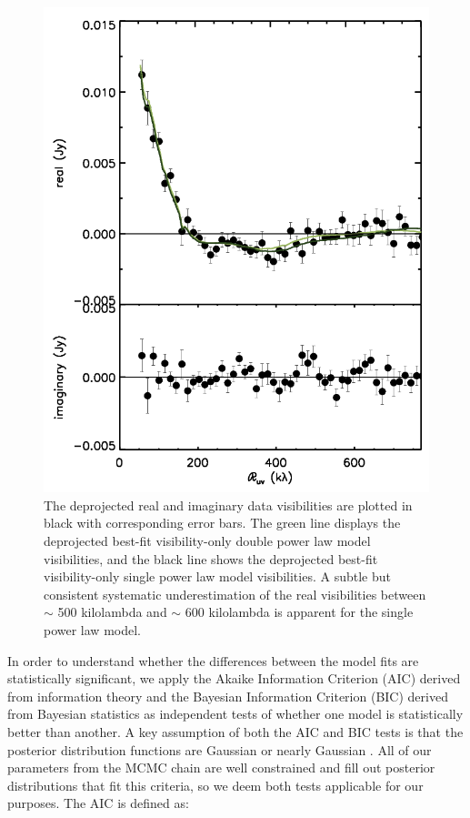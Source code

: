 {{\begin{figure}
\centering
\includegraphics[width = 1\textwidth]{49CET_bestModelDeprojections_data_greenDP_blackPL.png}
\caption{The deprojected real and imaginary data visibilities are plotted in black with corresponding error bars. The green line displays the deprojected best-fit visibility-only double power law model visibilities, and the black line shows the deprojected best-fit visibility-only single power law model visibilities. A subtle but consistent systematic underestimation of the real visibilities between $\sim$ 500 kilolambda and $\sim$ 600 kilolambda is apparent for the single power law model.}
\label{fig:deprojected_DP_PL_Vis}
\end{figure}

In order to understand whether the differences between the model fits are statistically significant, we apply the Akaike Information Criterion (AIC) derived from information theory and the Bayesian Information Criterion (BIC) derived from Bayesian statistics as independent tests of whether one model is statistically better than another. A key assumption of both the AIC and BIC tests is that the posterior distribution functions are Gaussian or nearly Gaussian \citep{Lidd07}. All of our parameters from the MCMC chain are well constrained and fill out posterior distributions that fit this criteria, so we deem both tests applicable for our purposes. The AIC is defined as:

}}
